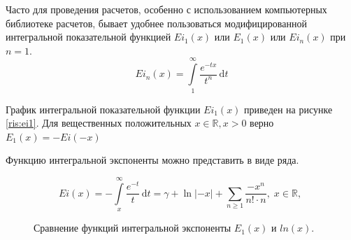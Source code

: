 
Часто для проведения расчетов, особенно с использованием компьютерных библиотеке расчетов, бывает удобнее пользоваться модифицированной интегральной показательной функцией $Ei_1(x)$ или $E_1(x)$ или $Ei_n(x)$ при $n=1$.
 $$Ei_n(x) = \int\limits_{1}^{\infty}\frac{e^{-tx}}{t^n}\,\mathrm dt $$

График интегральной показательной функции $Ei_1(x)$ приведен на рисунке \ref{ris:ei1}.
Для вещественных положительных $x\in\mathbb R, x>0$ верно $E_1(x) = - Ei( -x)$

Функцию интегральной экспоненты можно представить в виде ряда. 

$$Ei(x)=-\int\limits_{x}^{\infty}\frac{e^{-t}}{t}\,\mathrm dt=\gamma+\operatorname{ln}|-x|+\sum\limits_{n\ge1}\frac{{-x}^n}{n!\cdot n}, \;  x\in\mathbb R,\;$$

\begin{figure}
	\begin{center}
		\caption{Сравнение функций интегральной экспоненты $E_1(x)$ и $ln(x)$.}
		\label{ris:ei2}
	\end{center}
\end{figure}

